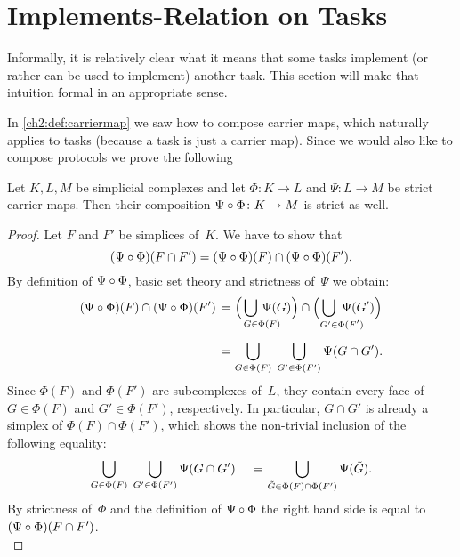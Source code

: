 \section{Implements-Relation on Tasks}
Informally, it is relatively clear what it means that some tasks implement
(or rather can be used to implement) another task. This section will make
that intuition formal in an appropriate sense.

In \cref{ch2:def:carriermap} we saw how to compose carrier maps,
which naturally applies to tasks (because a task is just a carrier
map). Since we would also like to compose protocols we prove the following

\begin{thLemma}
    Let $K,L,M$ be simplicial complexes and let $\Phi\colon K\to L$
    and $\Psi\colon L\to M$ be strict carrier maps.
    Then their composition $\Psi\after\Phi\colon K\to M$ is strict as well.
\end{thLemma}

\begin{proof}
    Let $F$ and $F'$ be simplices of~$K$. We have to show that
    \[ (\Psi\after\Phi)(F\cap F')
        = (\Psi\after\Phi)(F) \cap (\Psi\after\Phi)(F')
    . \]
    By definition of $\Psi\after\Phi$, basic set theory and strictness
    of~$\Psi$ we obtain:
    \begin{align*}
    (\Psi\after\Phi)(F) \cap (\Psi\after\Phi)(F')
        \,&=
        \Bigl( \mkern2mu \bigcup_{G\in\mathrlap{\Phi(F)}} \, \Psi(G) \Bigr)
            \cap \Bigl( \bigcup_{G'\in\mathrlap{\Phi(F')}} \, \Psi(G') \Bigr)
            \\[5pt]
        &=
        \bigcup_{G\in\Phi(F)} \; \bigcup_{G'\in\Phi(F')}
            \Psi(G\cap G')
    . \end{align*}
    Since $\Phi(F)$ and $\Phi(F')$ are subcomplexes of~$L$, they contain every
    face of $G\in\Phi(F)$ and $G'\in\Phi(F')$, respectively. In particular,
    $G\cap G'$ is already a simplex of $\Phi(F)\cap\Phi(F')$, which shows the
    non-trivial inclusion of the following equality:
\pagebreak[2]
    \[ \bigcup_{G\in\Phi(F)} \; \bigcup_{G'\in\Phi(F')} \Psi(G\cap G')
        \quad\mkern2mu=\mkern2mu
        \bigcup_{\tilde G\in\Phi(F)\cap \Phi(F')} \Psi(\tilde G)
    . \]
    By strictness of~$\Phi$ and the definition of $\Psi\after\Phi$ the right
    hand side is equal to $(\Psi\after\Phi)(F\cap F')$.
    \\
\end{proof}

